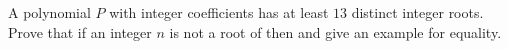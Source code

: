 A polynomial $P$ with integer coefficients has at least $13$ distinct integer roots. Prove that if an integer $n$ is not a root of  then  and give an example for equality.